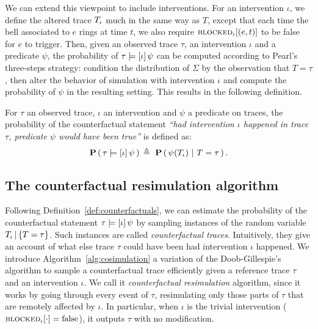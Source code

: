We can extend this viewpoint to include interventions. For an
intervention $\iota$, we define the altered trace ${T_\iota}{}$ much in
the same way as $T$, except that each time the bell associated to $e$
rings at time $t$, we also require ${\textsc{blocked}}_{\iota}[(e, t)]$ to be
false for $e$ to trigger. Then, given an observed trace $\tau$, an
intervention $\iota$ and a predicate $\psi$,
the probability of $\tau \models [\iota] \, \psi{}$ can be computed according to Pearl's
three-steps strategy: \ItAbduction{} condition the distribution of
$\Sigma$ by the observation that $T=\tau$, then \ItAction{} alter
the behavior of simulation with intervention $\iota$ and
\ItPrediction{} compute the probability of $\psi$ in the resulting
setting. This results in the following definition.

\begin{definition}\label{def:counterfactuals}
  For $\tau$ an observed trace, $\iota$ an intervention and $\psi$ a
  predicate on traces, the probability of the counterfactual statement
  \textit{``had intervention $\iota$ happened in trace $\tau$,
    predicate $\psi$ would have been true''} is defined as:
  \[ \PCFST{} \eqdef \ \ProbParen{\psi(\ATRAJ{}) \ |\ T = \tau}. \]
\end{definition}




\subsection{The counterfactual resimulation algorithm}
\label{subsec:cosim-algo}

Following Definition~\ref{def:counterfactuals}, we can estimate the
probability of the counterfactual statement
$\tau \models [\iota] \, \psi{}$ by sampling instances of the random
variable ${T_\iota\,|\,\{T=\tau\}}{}$. Such instances are called \emph{counterfactual
  traces}. Intuitively, they give an account of what else trace $\tau$
could have been had intervention $\iota$ happened.  We introduce
Algorithm~\ref{alg:cosimulation} a variation of the Doob-Gillespie's
algorithm to sample a counterfactual trace efficiently given a
reference trace $\tau$ and an intervention $\iota$.  We call it
\emph{counterfactual resimulation} algorithm, since it works by going
through every event of $\tau$, resimulating only those parts of $\tau$
that are remotely affected by $\iota$. In particular, when $\iota$ is
the trivial intervention (${\textsc{blocked}}_{\iota}[\cdot] = \text{false}$), it
outputs $\tau$ with no modification.


